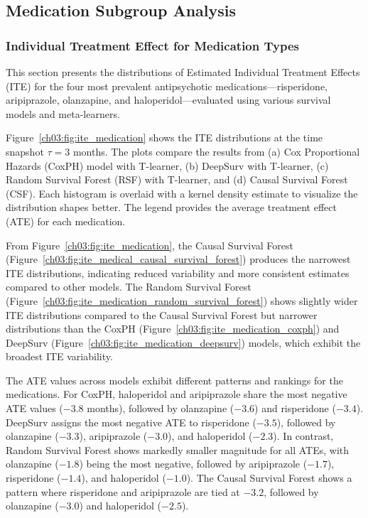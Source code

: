 \subsection{Medication Subgroup Analysis}\ChThreeHeadingOnly
\label{ch03:apd:medication_subgroup_analysis}





\subsubsection{Individual Treatment Effect for Medication Types}
\label{ch03:apd:ite_medication}





This section presents the distributions of Estimated Individual Treatment Effects (ITE) for the four most prevalent antipsychotic medications—risperidone, aripiprazole, olanzapine, and haloperidol—evaluated using various survival models and meta-learners.

Figure~\ref{ch03:fig:ite_medication} shows the ITE distributions at the time snapshot \(\tau=3\) months.
The plots compare the results from (a) Cox Proportional Hazards (CoxPH) model with T-learner, (b) DeepSurv with T-learner, (c) Random Survival Forest (RSF) with T-learner, and (d) Causal Survival Forest (CSF).
Each histogram is overlaid with a kernel density estimate to visualize the distribution shapes better.
The legend provides the average treatment effect (ATE) for each medication.

From Figure~\ref{ch03:fig:ite_medication}, the Causal Survival Forest (Figure~\ref{ch03:fig:ite_medical_causal_survival_forest}) produces the narrowest ITE distributions, indicating reduced variability and more consistent estimates compared to other models. 
The Random Survival Forest (Figure~\ref{ch03:fig:ite_medication_random_survival_forest}) shows slightly wider ITE distributions compared to the Causal Survival Forest but narrower distributions than the CoxPH (Figure~\ref{ch03:fig:ite_medication_coxph}) and DeepSurv (Figure~\ref{ch03:fig:ite_medication_deepsurv}) models, which exhibit the broadest ITE variability.

The ATE values across models exhibit different patterns and rankings for the medications. 
For CoxPH, haloperidol and aripiprazole share the most negative ATE values (\(-3.8\) months), followed by olanzapine (\(-3.6\)) and risperidone (\(-3.4\)). 
DeepSurv assigns the most negative ATE to risperidone (\(-3.5\)), followed by olanzapine (\(-3.3\)), aripiprazole (\(-3.0\)), and haloperidol (\(-2.3\)). 
In contrast, Random Survival Forest shows markedly smaller magnitude for all ATEs, with olanzapine (\(-1.8\)) being the most negative, followed by aripiprazole (\(-1.7\)), risperidone (\(-1.4\)), and haloperidol (\(-1.0\)). 
The Causal Survival Forest shows a pattern where risperidone and aripiprazole are tied at \(-3.2\), followed by olanzapine (\(-3.0\)) and haloperidol (\(-2.5\)).


